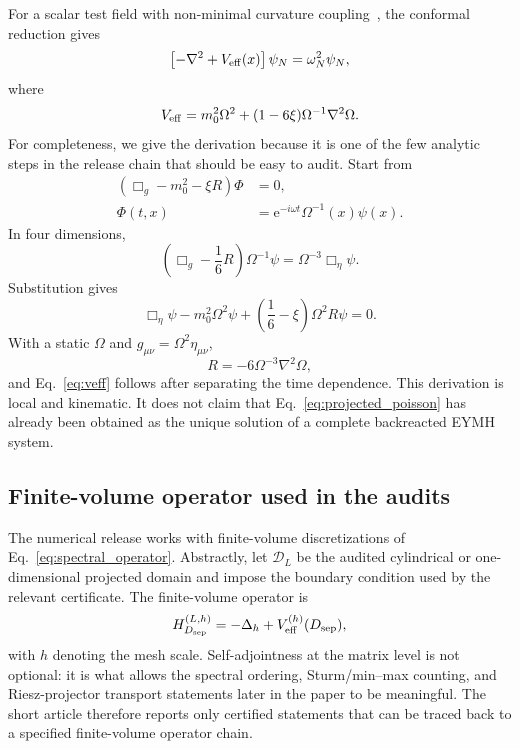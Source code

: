 \documentclass[pdflatex,sn-mathphys-num,iicol]{sn-jnl}
\newcommand{\ee}{\mathrm{e}}
\newcommand{\Dsep}{D_{\rm sep}}
\begin{document}
For a scalar test field with non-minimal curvature coupling~\cite{BirrellDavies1982}, the conformal reduction gives
\begin{equation}
    \left[-\nabla^2+V_{\rm eff}(x)\right]\psi_N=\omega_N^2\psi_N,
    \label{eq:spectral_operator}
\end{equation}
where
\begin{equation}
    V_{\rm eff}=m_0^2\Omega^2+(1-6\xi)\Omega^{-1}\nabla^2\Omega.
    \label{eq:veff}
\end{equation}
For completeness, we give the derivation because it is one of the few analytic steps in the release chain that should be easy to audit.
Start from
\begin{equation}
    \begin{aligned}
    (\Box_g-m_0^2-\xi R)\Phi&=0,\\
    \Phi(t,x)&=\ee^{-i\omega t}\Omega^{-1}(x)\psi(x).
    \end{aligned}
\end{equation}
In four dimensions,
\begin{equation}
    \left(\Box_g-\frac{1}{6}R\right)\Omega^{-1}\psi
    =
    \Omega^{-3}\Box_\eta\psi.
    \label{eq:conformal_identity}
\end{equation}
Substitution gives
\begin{equation}
    \Box_\eta\psi-m_0^2\Omega^2\psi+\left(\frac{1}{6}-\xi\right)\Omega^2R\psi=0.
\end{equation}
With a static \(\Omega\) and \(g_{\mu\nu}=\Omega^2\eta_{\mu\nu}\),
\begin{equation}
    R=-6\Omega^{-3}\nabla^2\Omega,
\end{equation}
and Eq.~\eqref{eq:veff} follows after separating the time dependence.
This derivation is local and kinematic.
It does not claim that Eq.~\eqref{eq:projected_poisson} has already been obtained as the unique solution of a complete backreacted EYMH system.

\subsection{Finite-volume operator used in the audits}

The numerical release works with finite-volume discretizations of Eq.~\eqref{eq:spectral_operator}.
Abstractly, let \(\mathcal D_L\) be the audited cylindrical or one-dimensional projected domain and impose the boundary condition used by the relevant certificate.
The finite-volume operator is
\begin{equation}
    H_{\Dsep}^{(L,h)}
    =
    -\Delta_h+V_{\rm eff}^{(h)}(\Dsep),
    \label{eq:finite_volume_operator}
\end{equation}
with \(h\) denoting the mesh scale.
Self-adjointness at the matrix level is not optional: it is what allows the spectral ordering, Sturm/min--max counting, and Riesz-projector transport statements later in the paper to be meaningful.
The short article therefore reports only certified statements that can be traced back to a specified finite-volume operator chain.
\end{document}
